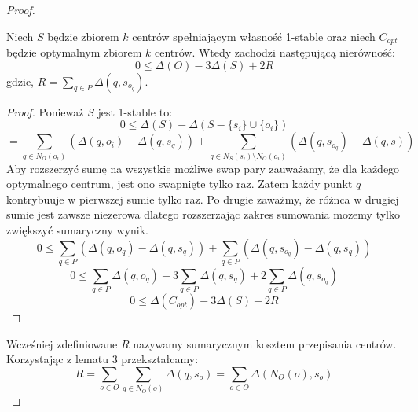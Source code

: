 \begin{proof}
    \begin{lemma}
        Niech $S$ będzie zbiorem $k$ centrów spełniającym własność 1-stable oraz niech $C_{opt}$ będzie optymalnym zbiorem $k$ centrów.
        Wtedy zachodzi następującą nierówność:
        \begin{equation}
            0 \leq \Delta(O) - 3\Delta(S) + 2R
        \end{equation}
        gdzie, $R = \sum_{q \in P} \Delta(q, s_{o_{q}})$.
    \end{lemma}
    \begin{proof}
        Ponieważ $S$ jest 1-stable to:
        \begin{equation}
           0 \leq \Delta(S) -  \Delta(S - \{s_{i}\} \cup \{o_{i}\})
        \end{equation}
        \begin{equation}
            = \sum_{q \in N_{O}(o_{i})} (\Delta(q, o_{i}) - \Delta(q, s_{q})) + \sum_{q \in N_{S}(s_{i}) \setminus N_{O}(o_{i})} (\Delta(q, s_{o_{q}}) - \Delta(q, s))
        \end{equation}
        Aby rozszerzyć sumę na wszystkie możliwe swap pary zauważamy, że dla każdego optymalnego centrum, jest ono swapnięte tylko raz.
        Zatem każdy punkt $q$ kontrybuuje w pierwszej sumie tylko raz.
        Po drugie zaważmy, że różnca w drugiej sumie jest zawsze niezerowa dlatego rozszerzając zakres sumowania mozemy tylko zwiększyć sumaryczny wynik.
        \begin{equation}
            0 \leq \sum_{q \in P} (\Delta(q, o_{q}) - \Delta(q, s_{q})) + \sum_{q \in P} (\Delta(q, s_{o_{q}}) - \Delta(q, s_{q}))
        \end{equation}
        \begin{equation}
            0 \leq \sum_{q \in P} \Delta(q, o_{q}) - 3 \sum_{q \in P} \Delta(q, s_{q}) + 2\sum_{q \in P} \Delta(q, s_{o_{q}})
        \end{equation}
        \begin{equation}
            0 \leq \Delta(C_{opt}) - 3 \Delta(S) + 2R
        \end{equation}
    \end{proof}
    \noindent
    Wcześniej zdefiniowane $R$ nazywamy sumarycznym kosztem przepisania centrów.
    Korzystając z lematu 3 przekształcamy:
    \begin{equation}
        R = \sum_{o \in O} \sum_{q \in N_{O}(o)} \Delta(q, s_{o}) = \sum_{o \in O} \Delta(N_{O}(o), s_{o}) 
    \end{equation}
    \begin{equation}

\end{equation}
\end{proof}
